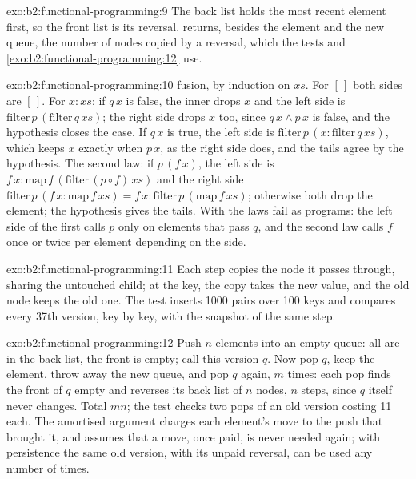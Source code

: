 \begin{solution}{exo:b2:functional-programming:9}
The back list holds the most recent element first, so the front list is its reversal.  returns, besides
the element and the new queue, the number of nodes copied by a reversal, which the tests and
\cref{exo:b2:functional-programming:12} use.
\end{solution}

\begin{solution}{exo:b2:functional-programming:10}
 fusion, by induction on $xs$. For $[\,]$ both sides are $[\,]$. For $x : xs$: if $q\,x$ is false, the inner
 drops $x$ and the left side is $\mathrm{filter}\,p\,(\mathrm{filter}\,q\,xs)$; the right side drops $x$ too,
since $q\,x \wedge p\,x$ is false, and the hypothesis closes the case. If $q\,x$ is true, the left side is
$\mathrm{filter}\,p\,(x : \mathrm{filter}\,q\,xs)$, which keeps $x$ exactly when $p\,x$, as the right side does, and
the tails agree by the hypothesis. The second law: if $p\,(f\,x)$, the left side is $f\,x : \mathrm{map}\,f\,
(\mathrm{filter}\,(p \circ f)\,xs)$ and the right side $\mathrm{filter}\,p\,(f\,x : \mathrm{map}\,f\,xs) = f\,x :
\mathrm{filter}\,p\,(\mathrm{map}\,f\,xs)$; otherwise both drop the element; the hypothesis gives the tails. With  the laws fail as programs: the left side of the first calls $p$ only on elements that pass $q$, and the second
law calls $f$ once or twice per element depending on the side.
\end{solution}

\begin{solution}{exo:b2:functional-programming:11}
Each step copies the node it passes through, sharing the untouched child; at the key, the copy takes the new value,
and the old node keeps the old one. The test inserts 1000 pairs over 100 keys and compares every 37th version, key by
key, with the  snapshot of the same step.
\end{solution}

\begin{solution}{exo:b2:functional-programming:12}
Push $n$ elements into an empty queue: all are in the back list, the front is empty; call this version $q$. Now pop
$q$, keep the element, throw away the new queue, and pop $q$ again, $m$ times: each pop finds the front of $q$ empty
and reverses its back list of $n$ nodes, $n$ steps, since $q$ itself never changes. Total $mn$; the test checks two
pops of an old version costing 11 each. The amortised argument charges each element's move to the push that brought
it, and assumes that a move, once paid, is never needed again; with persistence the same old version, with its
unpaid reversal, can be used any number of times.
\end{solution}

